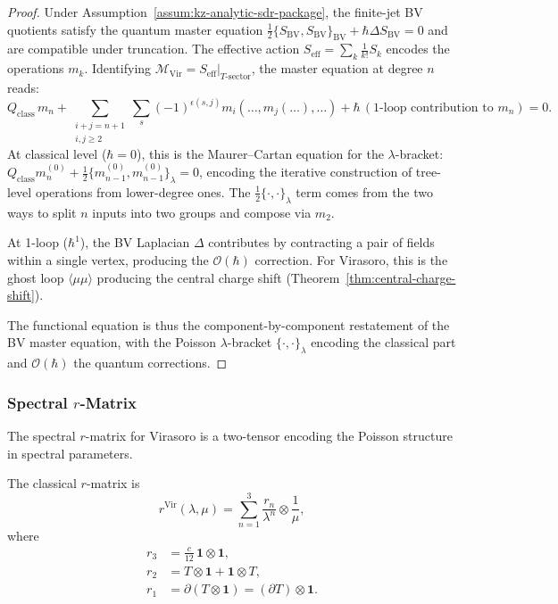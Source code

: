\begin{proof}
Under Assumption~\ref{assum:kz-analytic-sdr-package}, the finite-jet
BV quotients satisfy the quantum master equation
$\tfrac{1}{2}\{S_{\mathrm{BV}}, S_{\mathrm{BV}}\}_{\mathrm{BV}}
+ \hbar\Delta S_{\mathrm{BV}} = 0$ and are compatible under
truncation. The effective action
$S_{\mathrm{eff}} = \sum_k \frac{1}{k!} S_k$ encodes the operations
$m_k$. Identifying
$\mathcal{M}_{\mathrm{Vir}} = S_{\mathrm{eff}}|_{T\text{-sector}}$,
the master equation at degree $n$ reads:
\[
Q_{\mathrm{class}}\, m_n + \sum_{\substack{i+j=n+1\\i,j\ge 2}} \sum_{s} (-1)^{\epsilon(s,j)} m_i(\ldots, m_j(\ldots), \ldots) + \hbar\,(\text{1-loop contribution to } m_n) = 0.
\]
At classical level ($\hbar = 0$), this is the Maurer--Cartan equation for the $\lambda$-bracket: $Q_{\mathrm{class}} m_n^{(0)} + \frac{1}{2}\{m_{n-1}^{(0)}, m_{n-1}^{(0)}\}_\lambda = 0$, encoding the iterative construction of tree-level operations from lower-degree ones. The $\frac{1}{2}\{\cdot, \cdot\}_\lambda$ term comes from the two ways to split $n$ inputs into two groups and compose via $m_2$.

At 1-loop ($\hbar^1$), the BV Laplacian $\Delta$ contributes by contracting a pair of fields within a single vertex, producing the $\mathcal{O}(\hbar)$ correction. For Virasoro, this is the ghost loop $\langle\mu\mu\rangle$ producing the central charge shift (Theorem~\ref{thm:central-charge-shift}).

The functional equation is thus the component-by-component restatement of the BV master equation, with the Poisson $\lambda$-bracket $\{\cdot, \cdot\}_\lambda$ encoding the classical part and $\mathcal{O}(\hbar)$ the quantum corrections.
\end{proof}

\subsubsection{Spectral $r$-Matrix}

The spectral $r$-matrix for Virasoro is a two-tensor encoding the Poisson structure in spectral parameters.

\begin{definition}
The classical $r$-matrix is
\begin{equation}
r^{\text{Vir}}(\lambda, \mu) = \sum_{n=1}^3 \frac{r_n}{\lambda^n} \otimes \frac{1}{\mu},
\end{equation}
where
\begin{align}
r_3 &= \frac{c}{12} \, \mathbf{1} \otimes \mathbf{1},\\
r_2 &= T \otimes \mathbf{1} + \mathbf{1} \otimes T,\\
r_1 &= \partial(T \otimes \mathbf{1}) = (\partial T) \otimes \mathbf{1}.
\end{align}
\end{definition}

